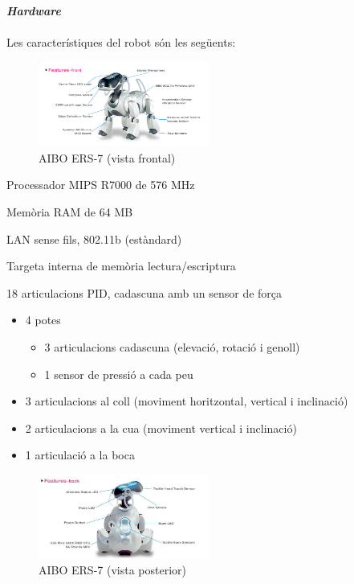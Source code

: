 \documentclass[12pt,a4paper,final,twoside]{article}
\begin{document}

\label{Hardware}
\vspace{20pt}
\textbf{\textit{Hardware}}

\paragraph{}Les característiques del robot són les següents: \cite{Anshar2007}

\begin{itemize}
\begin{minipage}[t]{\textwidth}

\begin{figure}
                \includegraphics[width=0.5\textwidth]{Imatges/ERS-7(front)}
                \caption{AIBO ERS-7 (vista frontal) \cite{Aibo_Images}}
\end{figure}
\item Processador MIPS R7000 de 576 MHz 
\item Memòria RAM de 64 MB
\item LAN sense fils, 802.11b (estàndard)
\item Targeta interna de memòria lectura/escriptura 
\item 18 articulacions PID, cadascuna amb un sensor de força
\begin{itemize}
\item 4 potes
\begin{itemize}
\item 3 articulacions cadascuna (elevació, rotació i genoll)
\item 1 sensor de pressió a cada peu
\end{itemize}
\item 3 articulacions al coll (moviment horitzontal, vertical i inclinació)
\item 2 articulacions a la cua (moviment vertical i inclinació)
\item 1 articulació a la boca
\end{itemize}
\end{minipage}

\begin{minipage}[t]{\textwidth}
\begin{figure}
                \includegraphics[width=0.5\textwidth]{Imatges/ERS-7(back)}
                \caption{AIBO ERS-7 (vista posterior) \cite{Aibo_Images}}
\end{figure}


\end{minipage}
\end{itemize}
\end{document}
